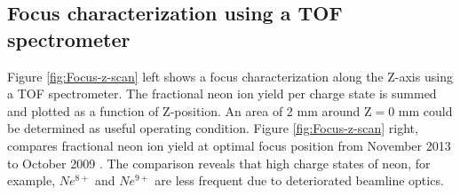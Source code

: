 \subsection{Focus characterization using a TOF spectrometer}
Figure \ref{fig:Focus-z-scan} left shows a focus characterization along the Z-axis using a TOF spectrometer. The fractional neon ion yield per charge state is summed and plotted as a function of Z-position. An area of 2 mm around $\text{Z}=0$ mm could be determined as useful operating condition. Figure \ref{fig:Focus-z-scan} right, compares fractional neon ion yield at optimal focus position from November 2013 \citep{Bucher-2016-Unpublished} to October 2009 \citep{Doumy-2011-PRL}. The comparison reveals that high charge states of neon, for example, $Ne^{8+}$ and $Ne^{9+}$ are less frequent due to deteriorated beamline optics.\\
